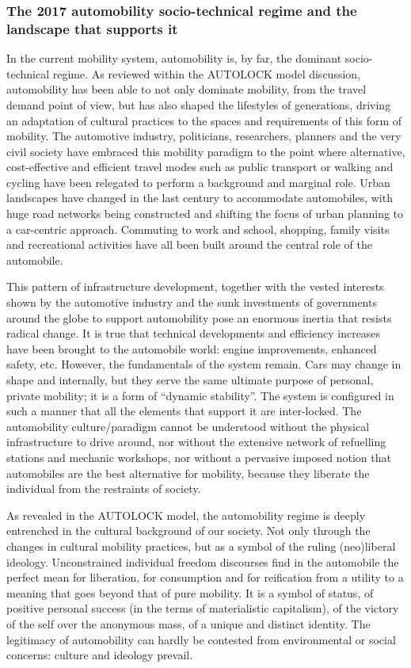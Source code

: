 \subsubsection*{The 2017 automobility socio-technical regime and the landscape that supports it}
In the current mobility system, automobility is, by far, the dominant socio-technical regime. As reviewed within the AUTOLOCK model discussion, automobility has been able to not only dominate mobility, from the travel demand point of view, but has also shaped the lifestyles of generations, driving an adaptation of cultural practices to the spaces and requirements of this form of mobility. The automotive industry, politicians, researchers, planners and the very civil society have embraced this mobility paradigm to the point where alternative, cost-effective and efficient travel modes such as public transport or walking and cycling have been relegated to perform a background and marginal role. Urban landscapes have changed in the last century to accommodate automobiles, with huge road networks being constructed and shifting the focus of urban planning to a car-centric approach. Commuting to work and school, shopping, family visits and recreational activities have all been built around the central role of the automobile.

This pattern of infrastructure development, together with the vested interests shown by the automotive industry and the sunk investments of governments around the globe to support automobility pose an enormous inertia that resists radical change. It is true that technical developments and efficiency increases have been brought to the automobile world: engine improvements, enhanced safety, etc. However, the fundamentals of the system remain. Cars may change in shape and internally, but they serve the same ultimate purpose of personal, private mobility; it is a form of ``dynamic stability''. The system is configured in such a manner that all the elements that support it are inter-locked. The automobility culture/paradigm cannot be understood without the physical infrastructure to drive around, nor without the extensive network of refuelling stations and mechanic workshops, nor without a pervasive imposed notion that automobiles are the best alternative for mobility, because they liberate the individual from the restraints of society.

As revealed in the AUTOLOCK model, the automobility regime is deeply entrenched in the cultural background of our society. Not only through the changes in cultural mobility practices, but as a symbol of the ruling (neo)liberal ideology. Unconstrained individual freedom discourses find in the automobile the perfect mean for liberation, for consumption and for reification from a utility to a meaning that goes beyond that of pure mobility. It is a symbol of status, of positive personal success (in the terms of materialistic capitalism), of the victory of the self over the anonymous mass, of a unique and distinct identity. The legitimacy of automobility can hardly be contested from environmental or social concerns: culture and ideology prevail.

